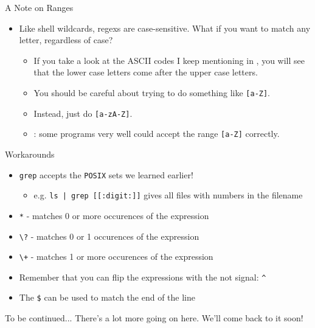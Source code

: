 \begin{frame}[fragile]{A Note on Ranges}
  \begin{itemize}[<+- | alert@+>]
    \item Like shell wildcards, regexs are case-sensitive.  What if you want to match any letter, regardless of case?
    \begin{itemize}[<+- | alert@+>]
      \item If you take a look at the ASCII codes I keep mentioning in \cite{ascii}, you will see that the lower case
            letters come after the upper case letters.
      \item You should be careful about trying to do something like \texttt{[a-Z]}.
      \item Instead, just do \texttt{[a-zA-Z]}.
      \item {}: some programs very well could accept the range \texttt{[a-Z]} correctly.
    \end{itemize}
  \end{itemize}
\end{frame}

\begin{frame}[fragile]{Workarounds}
  \begin{itemize}[<+- | alert@+>]
    \item \texttt{grep} accepts the \texttt{POSIX} sets we learned earlier!
    \begin{itemize}[<+- | alert@+>]
      \item e.g. \texttt{ls | grep [[:digit:]]} gives all files with numbers in the filename
    \end{itemize}
    \item \texttt{*} \-- matches 0 or more occurences of the expression
    \item \texttt{\textbackslash ?} \-- matches 0 or 1 occurences of the expression
    \item \texttt{\textbackslash +} \-- matches 1 or more occurences of the expression
    \item Remember that you can flip the expressions with the not signal: \texttt{\^{}}
    \item The \texttt{\$} can be used to match the end of the line
  \end{itemize}
\end{frame}

\begin{frame}[fragile]{To be continued...}
  There's a lot more going on here.  We'll come back to it soon!
\end{frame}

